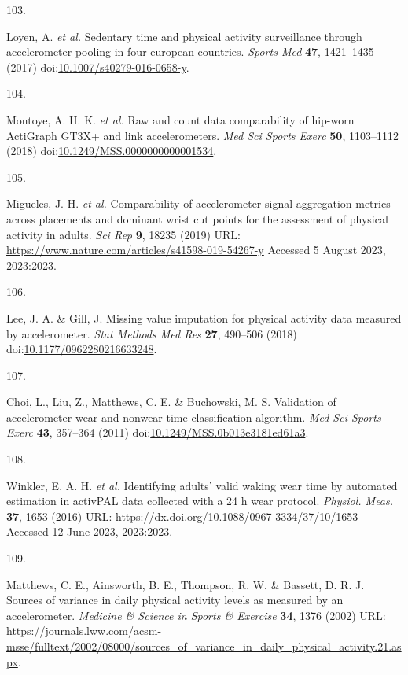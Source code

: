 \documentclass[
  10pt,
]{scrbook}
\newlength{\cslhangindent}
\newlength{\csllabelwidth}
\newlength{\cslentryspacingunit} %
\newenvironment{CSLReferences}[2] %
 {%
  \setlength{\parindent}{0pt}
  \ifodd #1
  \let\oldpar\par
  \def\par{\hangindent=\cslhangindent\oldpar}
  \fi
  \setlength{\parskip}{#2\cslentryspacingunit}
 }%
 {}
\newcommand{\CSLLeftMargin}[1]{\parbox[t]{\csllabelwidth}{#1}}
\newcommand{\CSLRightInline}[1]{\parbox[t]{\linewidth - \csllabelwidth}{#1}\break}
\let\originaltextbf\textbf
\renewcommand{\textbf}[1]{\textcolor{color1}{\textsf{\originaltextbf{#1}}}}
\begin{document}
\begin{CSLReferences}{0}{0}
\leavevmode{}%
\CSLLeftMargin{103. }%
\CSLRightInline{Loyen, A. \emph{et al.} Sedentary time and physical
activity surveillance through accelerometer pooling in four european
countries. \emph{Sports Med} \textbf{47}, 1421--1435 (2017)
doi:\href{https://doi.org/10.1007/s40279-016-0658-y}{10.1007/s40279-016-0658-y}.}

\leavevmode{}%
\CSLLeftMargin{104. }%
\CSLRightInline{Montoye, A. H. K. \emph{et al.} Raw and count data
comparability of hip-worn {ActiGraph} {GT}3X+ and link accelerometers.
\emph{Med Sci Sports Exerc} \textbf{50}, 1103--1112 (2018)
doi:\href{https://doi.org/10.1249/MSS.0000000000001534}{10.1249/MSS.0000000000001534}.}

\leavevmode{}%
\CSLLeftMargin{105. }%
\CSLRightInline{Migueles, J. H. \emph{et al.} Comparability of
accelerometer signal aggregation metrics across placements and dominant
wrist cut points for the assessment of physical activity in adults.
\emph{Sci Rep} \textbf{9}, 18235 (2019) URL:
\url{https://www.nature.com/articles/s41598-019-54267-y} Accessed 5
August 2023, 2023:2023.}

\leavevmode{}%
\CSLLeftMargin{106. }%
\CSLRightInline{Lee, J. A. \& Gill, J. Missing value imputation for
physical activity data measured by accelerometer. \emph{Stat Methods Med
Res} \textbf{27}, 490--506 (2018)
doi:\href{https://doi.org/10.1177/0962280216633248}{10.1177/0962280216633248}.}

\leavevmode{}%
\CSLLeftMargin{107. }%
\CSLRightInline{Choi, L., Liu, Z., Matthews, C. E. \& Buchowski, M. S.
Validation of accelerometer wear and nonwear time classification
algorithm. \emph{Med Sci Sports Exerc} \textbf{43}, 357--364 (2011)
doi:\href{https://doi.org/10.1249/MSS.0b013e3181ed61a3}{10.1249/MSS.0b013e3181ed61a3}.}

\leavevmode{}%
\CSLLeftMargin{108. }%
\CSLRightInline{Winkler, E. A. H. \emph{et al.} Identifying adults'
valid waking wear time by automated estimation in {activPAL} data
collected with a 24 h wear protocol. \emph{Physiol. Meas.} \textbf{37},
1653 (2016) URL: \url{https://dx.doi.org/10.1088/0967-3334/37/10/1653}
Accessed 12 June 2023, 2023:2023.}

\leavevmode{}%
\CSLLeftMargin{109. }%
\CSLRightInline{Matthews, C. E., Ainsworth, B. E., Thompson, R. W. \&
Bassett, D. R. J. Sources of variance in daily physical activity levels
as measured by an accelerometer. \emph{Medicine \& Science in Sports \&
Exercise} \textbf{34}, 1376 (2002) URL:
\url{https://journals.lww.com/acsm-msse/fulltext/2002/08000/sources_of_variance_in_daily_physical_activity.21.aspx}.}


\end{CSLReferences}
\end{document}
